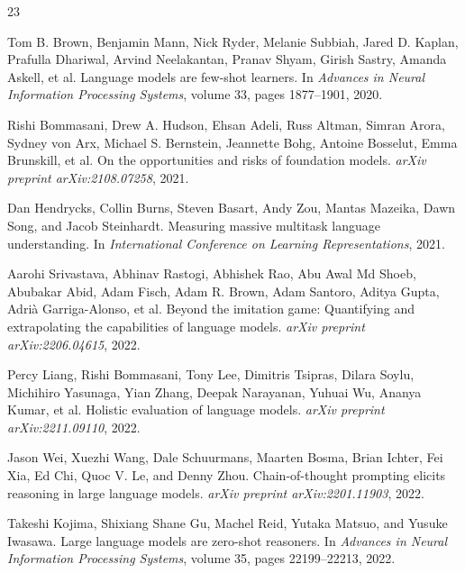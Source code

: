 \begin{thebibliography}{23}
\footnotesize\sloppy

Tom B. Brown, Benjamin Mann, Nick Ryder, Melanie Subbiah, Jared D. Kaplan, Prafulla Dhariwal, Arvind Neelakantan, Pranav Shyam, Girish Sastry, Amanda Askell, et al.
\newblock Language models are few-shot learners.
\newblock In \emph{Advances in Neural Information Processing Systems}, volume 33, pages 1877--1901, 2020.

Rishi Bommasani, Drew A. Hudson, Ehsan Adeli, Russ Altman, Simran Arora, Sydney von Arx, Michael S. Bernstein, Jeannette Bohg, Antoine Bosselut, Emma Brunskill, et al.
\newblock On the opportunities and risks of foundation models.
\newblock \emph{arXiv preprint arXiv:2108.07258}, 2021.

Dan Hendrycks, Collin Burns, Steven Basart, Andy Zou, Mantas Mazeika, Dawn Song, and Jacob Steinhardt.
\newblock Measuring massive multitask language understanding.
\newblock In \emph{International Conference on Learning Representations}, 2021.

Aarohi Srivastava, Abhinav Rastogi, Abhishek Rao, Abu Awal Md Shoeb, Abubakar Abid, Adam Fisch, Adam R. Brown, Adam Santoro, Aditya Gupta, Adri\`a Garriga-Alonso, et al.
\newblock Beyond the imitation game: Quantifying and extrapolating the capabilities of language models.
\newblock \emph{arXiv preprint arXiv:2206.04615}, 2022.

Percy Liang, Rishi Bommasani, Tony Lee, Dimitris Tsipras, Dilara Soylu, Michihiro Yasunaga, Yian Zhang, Deepak Narayanan, Yuhuai Wu, Ananya Kumar, et al.
\newblock Holistic evaluation of language models.
\newblock \emph{arXiv preprint arXiv:2211.09110}, 2022.

Jason Wei, Xuezhi Wang, Dale Schuurmans, Maarten Bosma, Brian Ichter, Fei Xia, Ed Chi, Quoc V. Le, and Denny Zhou.
\newblock Chain-of-thought prompting elicits reasoning in large language models.
\newblock \emph{arXiv preprint arXiv:2201.11903}, 2022.

Takeshi Kojima, Shixiang Shane Gu, Machel Reid, Yutaka Matsuo, and Yusuke Iwasawa.
\newblock Large language models are zero-shot reasoners.
\newblock In \emph{Advances in Neural Information Processing Systems}, volume 35, pages 22199--22213, 2022.


\end{thebibliography}
